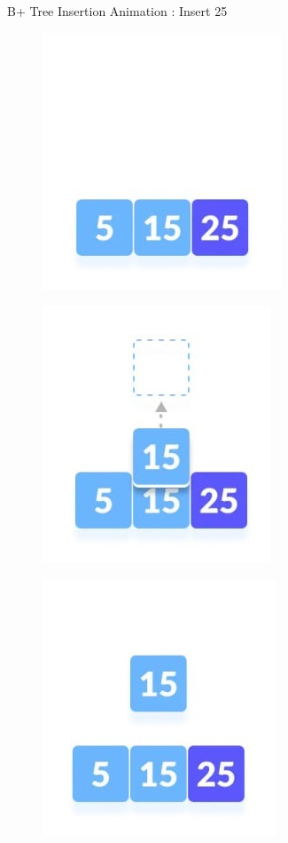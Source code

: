 \documentclass{beamer}
\begin{document}
\begin{frame}{B+ Tree Insertion Animation : \alert{Insert 25}}
    \begin{table}[h]
        \centering
        \begin{overprint}
        \begin{figure}
       
            \centering
            \includegraphics[scale=0.8]{Images/bi3_1_1.jpg}
        \end{figure}
        \begin{figure}
            \centering
            \includegraphics[scale=0.8]{Images/bi3_1_2.jpg}
        \end{figure}
        \begin{figure}
            \centering
            \includegraphics[scale=0.8]{Images/bi3_2_1.jpg}

\end{figure}
\end{overprint}
\end{table}
\end{frame}
\end{document}
